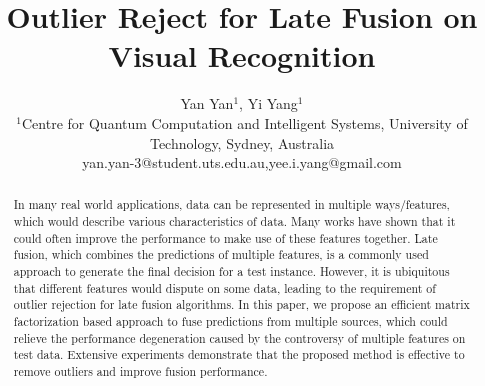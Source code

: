 \documentclass[letterpaper]{article}
\begin{document}
%



\title{Outlier Reject for Late Fusion on Visual Recognition}
\author{Yan Yan$^1$, Yi Yang$^1$\\
$^1$Centre for Quantum Computation and Intelligent Systems, University of Technology, Sydney, Australia\\
yan.yan-3@student.uts.edu.au,yee.i.yang@gmail.com}




\maketitle



\begin{abstract}
In many real world applications, data can be represented in multiple ways/features, which would describe various characteristics of data.
Many works have shown that it could often improve the performance to make use of these features together.
Late fusion, which combines the predictions of multiple features, is a commonly used approach to generate the final decision for a test instance.
However, it is ubiquitous that different features would dispute on some data, leading to the requirement of outlier rejection for late fusion algorithms.
In this paper, we propose an efficient matrix factorization based approach to fuse predictions from multiple sources, which could
relieve the performance degeneration caused by the controversy of multiple features on test data.
Extensive experiments demonstrate that the proposed method is effective to remove outliers and improve fusion performance.
\end{abstract}
\end{document}
